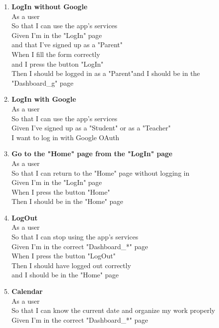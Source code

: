 \documentclass[Lau, binding=0.6cm]{sapthesis}
\begin{document}
\begin{enumerate}
	\item \textbf{LogIn without Google}\\
			As a user\\
			So that I can use the app’s services\\
			Given I’m in the "LogIn" page\\
			and that I’ve signed up as a "Parent"\\
			When I fill the form correctly\\
			and I press the button "LogIn"\\
			Then I should be logged in as a "Parent"and I should be in the "Dashboard\_g" page\\
	\item \textbf{LogIn with Google}\\
			As a user\\
			So that I can use the app’s services\\
			Given I’ve signed up as a "Student" or as a "Teacher"\\
			I want to log in with Google OAuth\\
	\item \textbf{Go to the "Home" page from the "LogIn" page}\\
			As a user\\
			So that I can return to the "Home" page without logging in\\
			Given I’m in the "LogIn" page\\
			When I press the button "Home"\\
			Then I should be in the "Home" page\\
	\item \textbf{LogOut}\\
			As a user\\
			So that I can stop using the app’s services\\
			Given I’m in the correct "Dashboard\_*" page\\
			When I press the button "LogOut"\\
			Then I should have logged out correctly\\
			and I should be in the "Home" page\\
	\item \textbf{Calendar}\\
			As a user\\
			So that I can know the current date and organize my work properly\\
			Given I’m in the correct "Dashboard\_*" page\\

\end{enumerate}
\end{document}

